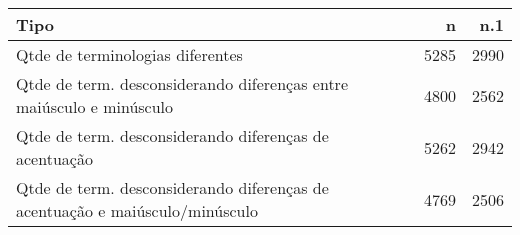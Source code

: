 \begin{table}[ht]
\centering
\begin{tabular}{lrr}
  \hline
Tipo & n & n.1 \\ 
  \hline
Qtde de terminologias diferentes & 5285 & 2990 \\ 
  Qtde de term. desconsiderando diferenças entre maiúsculo e minúsculo & 4800 & 2562 \\ 
  Qtde de term. desconsiderando diferenças de acentuação & 5262 & 2942 \\ 
  Qtde de term. desconsiderando diferenças de acentuação e
          maiúsculo/minúsculo & 4769 & 2506 \\ 
   \hline
\end{tabular}
\end{table}
